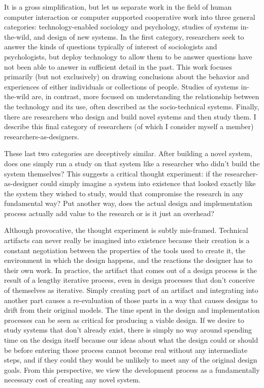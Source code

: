 It is a gross simplification, but let us separate work in the field of human computer interaction or computer supported cooperative work into three general categories: technology-enabled sociology and psychology, studies of systems in-the-wild, and design of new systems. In the first category, researchers seek to answer the kinds of questions typically of interest of sociologists and psychologists, but deploy technology to allow them to be answer questions have not been able to answer in sufficient detail in the past. This work focuses primarily (but not exclusively) on drawing conclusions about the behavior and experiences of either individuals or collections of people. Studies of systems in-the-wild are, in contrast, more focused on understanding the relationship between the technology and its use, often described as the socio-technical systems. Finally, there are researchers who design and build novel systems and then study them. I describe this final category of researchers (of which I consider myself a member) researchers-as-designers. 

These last two categories are deceptively similar. After building a novel system, does one simply run a study on that system like a researcher who didn't build the system themselves? This suggests a critical thought experiment: if the researcher-as-designer could simply imagine a system into existence that looked exactly like the system they wished to study, would that compromise the research in any fundamental way? Put another way, does the actual design and implementation process actually add value to the research or is it just an overhead?

Although provocative, the thought experiment is subtly mis-framed. Technical artifacts can never really be imagined into existence because their creation is a constant negotiation between the properties of the tools used to create it, the environment in which the design happens, and the reactions the designer has to their own work. In practice, the artifact that comes out of a design process is the result of a lengthy iterative process, even in design processes that don't conceive of themselves as iterative. Simply creating part of an artifact and integrating into another part causes a re-evaluation of those parts in a way that causes designs to drift from their original models. The time spent in the design and implementation processes can be seen as critical for producing a viable design. If we desire to study systems that don't already exist, there is simply no way around spending time on the design itself because our ideas about what the design could or should be before entering those process cannot become real without any intermediate steps, and if they could they would be unlikely to meet any of the original design goals. From this perspective, we view the development process as a fundamentally necessary cost of creating any novel system. 


